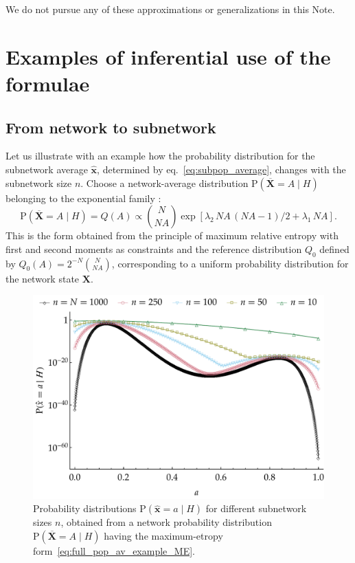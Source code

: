 \documentclass{article}
\newcommand*{\citep}{\parencites}
\theoremstyle{innote}
\newcommand*{\av}{\overline} %
\newcommand*{\sav}{\widehat} %
\newcommand*{\yx}{\bm{x}}%
\newcommand*{\yxs}{\sav{\yx}}%
\newcommand*{\yX}{\bm{X}}%
\newcommand*{\yXf}{\av{\yX}}%
\newcommand*{\yH}{\varEta}
\newcommand*{\yl}{\lambda}
\newcommand*{\eg}{{e.g.}}
\newcommand*{\cond}%
{\mathpunct{|}}%
\newcommand*{\p}{\mathrm{P}}%
\renewcommand*{\|}{\cond}
\newcommand*{\+}{\lor}
\newcommand*{\sect}{\S}%
\newcommand*{\eqn}{eq.}%
\let\varEta H
\begin{document}
We do not pursue any of these approximations or generalizations in this Note.




\section{Examples of inferential use of the formulae}

\subsection{From network to subnetwork}
\label{sec:pop2sub_examples}


Let us illustrate with an example how the probability distribution for the
subnetwork average $\yxs$, determined by \eqn~\eqref{eq:subpop_average},
changes with the subnetwork size $n$. Choose a network-average distribution
$\p(\yXf=A\cond \yH)$ belonging to the exponential family
\cites[\sect~4.5.3]{bernardoetal1994}[see also][]{fortinietal2000}:
\begin{equation}
  \label{eq:full_pop_av_example_ME}
  \p(\yXf = A \cond \yH) = Q(A) \propto
\binom{N}{N A}\exp[
\yl_2\, N A\,(N A-1)/2 + \yl_1\, N A].
\end{equation}
This is the form obtained from the principle of maximum relative entropy
\citep[\eg:][]{jaynes1957,jaynes1963,good1963,jaynes1967,aczeletal1975,jaynes1979b,vancampenhoutetal1981,sivia1990,fangetal1997,bretthorst2013}
with first and second moments as constraints and the reference distribution
$Q_0$ defined by $Q_0(A) = 2^{-N}\binom{N}{N A}$, corresponding to a
uniform probability distribution for the network state $\yX$.
\begin{figure}[!p]
\centering
\includegraphics[width=0.95\columnwidth]{scaled_subpop_probs.pdf}%
\caption{Probability distributions $\p(\yxs = a \cond \yH)$ for different
  subnetwork sizes $n$, obtained from a network probability
  distribution $\p(\yXf = A \cond \yH)$ having the maximum-etropy
  form~\eqref{eq:full_pop_av_example_ME}.}
\label{scaling_distr}
\end{figure}
\end{document}
